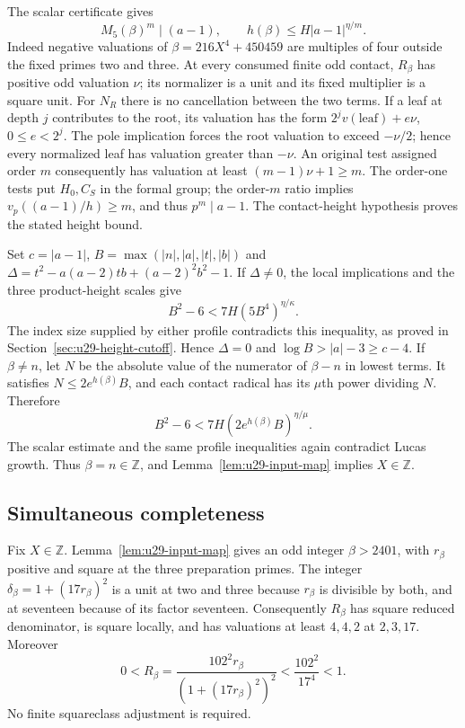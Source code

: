 \documentclass[11pt,a4paper]{article}
\theoremstyle{definition}
\theoremstyle{remark}
\begin{document}
The scalar certificate gives
\[
                 M_5(\beta)^m\mid(a-1),\qquad
                 h(\beta)\le H|a-1|^{\eta/m}.
\]
Indeed negative valuations of $\beta=216X^4+450459$
are multiples of four outside the fixed primes two and three.
At every consumed finite odd contact, $R_\beta$ has positive odd
valuation $\nu$; its normalizer is a unit and its fixed multiplier
is a square unit.
For $N_R$ there is no cancellation between the two terms.  If a leaf
at depth $j$ contributes to the root, its valuation has the form
$2^jv(\text{leaf})+e\nu$, $0\le e<2^j$.
The pole implication forces the root valuation to exceed $-\nu/2$;
hence every normalized leaf has valuation greater than $-\nu$.
An original test assigned order $m$ consequently has valuation
at least $(m-1)\nu+1\ge m$.  The order-one tests put $H_0,C_S$
in the formal group; the order-$m$ ratio implies
$v_p((a-1)/h)\ge m$, and thus $p^m\mid a-1$.
The contact-height hypothesis proves the stated height bound.

Set $c=|a-1|$, $B=\max(|n|,|a|,|t|,|b|)$ and
$\Delta=t^2-a(a-2)tb+(a-2)^2b^2-1$.
If $\Delta\ne0$, the local implications and the three product-height
scales give
\[
                    B^2-6<7H(5B^4)^{\eta/\kappa}.
\]
The index size supplied by either profile contradicts this inequality,
as proved in Section~\ref{sec:u29-height-cutoff}.  Hence $\Delta=0$
and $\log B>|a|-3\ge c-4$.
If $\beta\ne n$, let $N$ be the absolute value of the numerator of
$\beta-n$ in lowest terms.  It satisfies
$N\le2e^{h(\beta)}B$, and each contact radical has its $\mu$th power
dividing $N$.  Therefore
\[
                   B^2-6<7H(2e^{h(\beta)}B)^{\eta/\mu}.
\]
The scalar estimate and the same profile inequalities again contradict
Lucas growth.  Thus $\beta=n\in\mathbb Z$, and
Lemma~\ref{lem:u29-input-map} implies $X\in\mathbb Z$.

\subsection{Simultaneous completeness}

Fix $X\in\mathbb Z$.  Lemma~\ref{lem:u29-input-map} gives an odd
integer $\beta>2401$, with $r_\beta$ positive and square at the three
preparation primes.  The integer $\delta_\beta=1+(17r_\beta)^2$
is a unit at two and three because $r_\beta$ is divisible by both,
and at seventeen because of its factor seventeen.  Consequently
$R_\beta$ has square reduced denominator, is square locally, and has
valuations at least $4,4,2$ at $2,3,17$.  Moreover
\[
 0<R_\beta=\frac{102^2r_\beta}{(1+(17r_\beta)^2)^2}
       <\frac{102^2}{17^4}<1.
\]
No finite squareclass adjustment is required.
\end{document}
